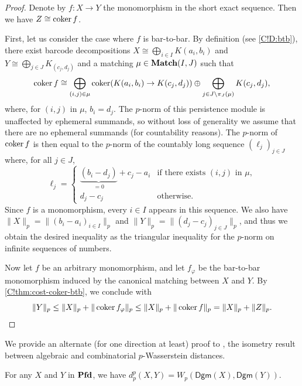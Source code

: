 \begin{proof}
  Denote by $f \colon X \to Y$ the monomorphism in the short exact sequence. Then we have $Z \cong \operatorname{coker} f$.

  First, let us consider the case where $f$ is bar-to-bar. By definition (see \cref{C!D:btb}), there exist barcode decompositions $X \cong \bigoplus_{i \in I} K(a_i, b_i)$ and $Y \cong \bigoplus_{j \in J} K_(c_j, d_j)$ and a matching $\mu \in \operatorname{\mathbf{Match}}(I, J)$ such that
  \[
    \operatorname{coker} f \cong \bigoplus_{(i, j) \in \mu} \operatorname{coker}(K(a_i, b_i) \to K(c_j, d_j)) \oplus \bigoplus_{j \in J \setminus \pi_J(\mu)} K(c_j, d_j),
  \]
  where, for $(i, j)$ in $\mu$, $b_i = d_j$.
  The $p$-norm of this persistence module is unaffected by ephemeral summands, so without loss of generality we assume that there are no ephemeral summands (for countability reasons). The $p$-norm of $\operatorname{coker} f$ is then equal to the $p$-norm of the countably long sequence $(\ell_j)_{j \in J}$ where, for all $j \in J$,
  \[
    \ell_j = \begin{cases}
      \underbrace{(b_i - d_j)}_{= 0} {} + c_j - a_i & \text{if there exists $(i, j)$ in $\mu$}, \\
      d_j - c_j & \text{otherwise}.
    \end{cases}
  \]
  Since $f$ is a monomorphism, every $i \in I$ appears in this sequence.
  We also have $\| X \|_p = \| (b_i - a_i)_{i \in I} \|_p$ and $\| Y \|_p = \| (d_j - c_j)_{j \in J} \|_p$, and thus we obtain the desired inequality as the triangular inequality for the $p$-norm on infinite sequences of numbers.

  Now let $f$ be an arbitrary monomorphism, and let $f_\varphi$ be the bar-to-bar monomorphism induced by the canonical matching between $X$ and $Y$. By \cref{C!thm:cost-coker-btb}, we conclude with
  \[
    \| Y \|_p \leq \| X \|_p + \| \operatorname{coker} f_\varphi \|_p \leq \| X \|_p + \| \operatorname{coker} f \|_p = \| X \|_p + \| Z \|_p.
    \qedhere
  \]
\end{proof}

We provide an alternate (for one direction at least) proof to \cite[Theorems 7.27-7.28]{SkrabaTurner2023}, the isometry result between algebraic and combinatorial $p$-Wasserstein distances.

\begin{theorem}
\label{C!T:isometry}
  For any $X$ and $Y$ in $\operatorname{\mathbf{Pfd}}$, we have $d_p^p (X,Y) = W_p (\mathsf{Dgm}(X),\mathsf{Dgm}(Y))$.
\end{theorem}

